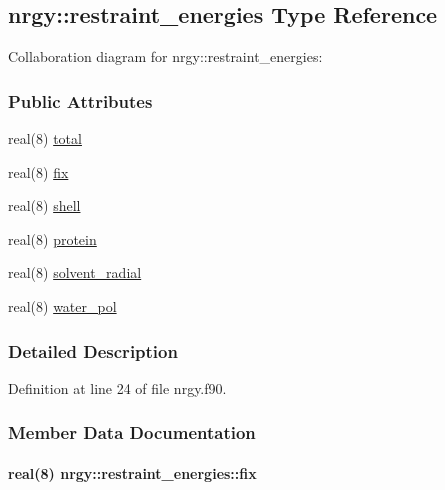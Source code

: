 \hypertarget{structnrgy_1_1restraint__energies}{\subsection{nrgy\-:\-:restraint\-\_\-energies Type Reference}
\label{structnrgy_1_1restraint__energies}
}


Collaboration diagram for nrgy\-:\-:restraint\-\_\-energies\-:
\subsubsection*{Public Attributes}
\begin{DoxyCompactItemize}
\item 
real(8) \hyperlink{structnrgy_1_1restraint__energies_ab5d7a01468f8c07bf7696c5b1e9ad994}{total}
\item 
real(8) \hyperlink{structnrgy_1_1restraint__energies_afa5ae03d6839a6f995a4f9aaf1ab3e76}{fix}
\item 
real(8) \hyperlink{structnrgy_1_1restraint__energies_a808979c4a706d6f6a4229b230891e5cf}{shell}
\item 
real(8) \hyperlink{structnrgy_1_1restraint__energies_ae289d7647d6a3e96fd5520432b10e0ce}{protein}
\item 
real(8) \hyperlink{structnrgy_1_1restraint__energies_a0fbe401d1ec0a9d53fb42075e1e57e7a}{solvent\-\_\-radial}
\item 
real(8) \hyperlink{structnrgy_1_1restraint__energies_a86b03f60830672f11820c63d62ee2065}{water\-\_\-pol}
\end{DoxyCompactItemize}


\subsubsection{Detailed Description}


Definition at line 24 of file nrgy.\-f90.



\subsubsection{Member Data Documentation}
\hypertarget{structnrgy_1_1restraint__energies_afa5ae03d6839a6f995a4f9aaf1ab3e76}{
\paragraph[{fix}]{\setlength{\rightskip}{0pt plus 5cm}real(8) nrgy\-::restraint\-\_\-energies\-::fix}}\label{structnrgy_1_1restraint__energies_afa5ae03d6839a6f995a4f9aaf1ab3e76}


